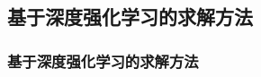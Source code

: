 \documentclass[11pt, aspectratio=169]{beamer}  %
\begin{document}
\subsection{基于深度强化学习的求解方法}
\begin{frame}
	\frametitle{基于深度强化学习的求解方法}
	\begin{columns}
		\begin{column}{0.5\textwidth}
			\centering
			
		\end{column}
		\begin{column}{0.5\textwidth}
			\centering
			
		\end{column}
	\end{columns}
\end{frame}
\end{document}
